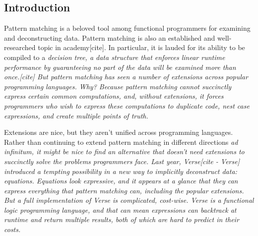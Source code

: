 \documentclass[manuscript,screen,review, 12pt, nonacm]{acmart}
\begin{document}
\maketitle
\begin{outline}[enumerate]
    


\section{Introduction}

Pattern matching is a beloved tool among functional programmers for examining
and deconstructing data. 
Pattern matching is also an established and well-researched topic in
academy[cite]. In particular, it is lauded for its ability to be compiled to a
\it{decision tree}, a data structure that enforces linear runtime performance by
guaranteeing no part of the data will be examined more than once.[cite]
But pattern matching has seen a number of extensions across popular programming
languages. Why? 
Because pattern matching cannot succinctly express certain
common computations, and, without extensions, it forces programmers who wish to
express these computations to duplicate code, nest case expressions, and create
multiple points of truth. 

Extensions are nice, but they aren't unified across programming languages.
Rather than continuing to extend pattern matching in different directions \it{ad
infinitum}, it might be nice to find an alternative that doesn't need extensions
to succinctly solve the problems programmers face. Last year, Verse[cite -
Verse] introduced a tempting possibility in a new way to implicitly deconstruct
data: equations. Equations look expressive, and it appears at a glance that they
can express everything that pattern matching can, including the popular
extensions. 
But a full implementation of Verse is complicated, cost-wise. Verse is a
functional logic programming language, and that can mean expressions can
backtrack at runtime and return multiple results, both of which are
hard to predict in their costs. 


\end{outline}
\end{document}
